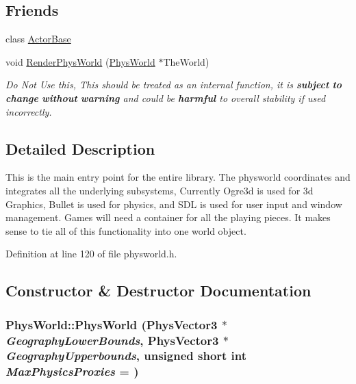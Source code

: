 \subsection*{Friends}
\begin{DoxyCompactItemize}
\item 
\hypertarget{classPhysWorld_ac09063d4b0192680ba3aa0bd4003a274}{
class \hyperlink{classPhysWorld_ac09063d4b0192680ba3aa0bd4003a274}{ActorBase}}
\label{db/df5/classPhysWorld_ac09063d4b0192680ba3aa0bd4003a274}

\item 
void \hyperlink{classPhysWorld_a54ca2a75bbccb9b2129f434874f1e693}{RenderPhysWorld} (\hyperlink{classPhysWorld}{PhysWorld} $\ast$TheWorld)
\begin{DoxyCompactList}\small\item\em Do Not Use this, This should be treated as an internal function, it is {\bfseries subject} {\bfseries to} {\bfseries change} {\bfseries without} {\bfseries warning} and could be {\bfseries harmful} to overall stability if used incorrectly. \item\end{DoxyCompactList}\end{DoxyCompactItemize}


\subsection{Detailed Description}
This is the main entry point for the entire library. The physworld coordinates and integrates all the underlying subsystems, Currently Ogre3d is used for 3d Graphics, Bullet is used for physics, and SDL is used for user input and window management. Games will need a container for all the playing pieces. It makes sense to tie all of this functionality into one world object. 

Definition at line 120 of file physworld.h.

\subsection{Constructor \& Destructor Documentation}
\hypertarget{classPhysWorld_a3228c98369082139722d3c918d735e6c}{
\subsubsection[{PhysWorld}]{\setlength{\rightskip}{0pt plus 5cm}PhysWorld::PhysWorld ({\bf PhysVector3} $\ast$ {\em GeographyLowerBounds}, \/  {\bf PhysVector3} $\ast$ {\em GeographyUpperbounds}, \/  unsigned short int {\em MaxPhysicsProxies} = {})}}
\label{db/df5/classPhysWorld_a3228c98369082139722d3c918d735e6c}


